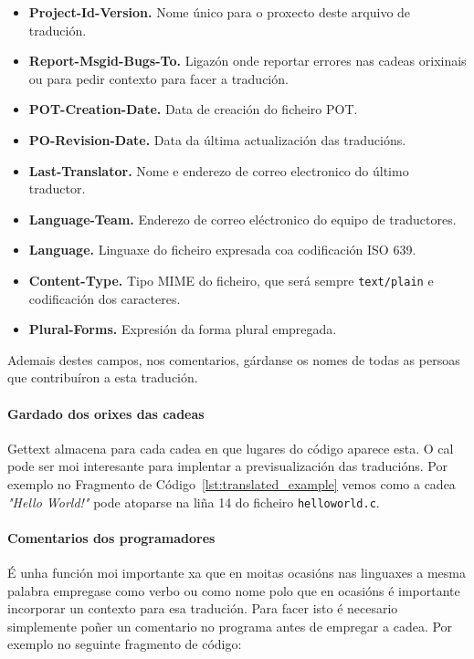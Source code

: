 \begin{itemize}
    \item \textbf{Project-Id-Version.} Nome único para o proxecto deste arquivo de tradución.
    \item \textbf{Report-Msgid-Bugs-To.} Ligazón onde reportar errores nas cadeas orixinais ou para pedir contexto para facer a tradución.
    \item \textbf{POT-Creation-Date.} Data de creación do ficheiro POT.
    \item \textbf{PO-Revision-Date.} Data da última actualización das traducións.
    \item \textbf{Last-Translator.} Nome e enderezo de correo electronico do último traductor.
    \item \textbf{Language-Team.} Enderezo de correo eléctronico do equipo de traductores.
    \item \textbf{Language.} Linguaxe do ficheiro expresada coa codificación ISO 639.
    \item \textbf{Content-Type.} Tipo MIME do ficheiro, que será sempre \lstinline{text/plain} e codificación dos caracteres.
    \item \textbf{Plural-Forms.} Expresión da forma plural empregada.
\end{itemize}

Ademais destes campos, nos comentarios, gárdanse os nomes de todas as persoas que contribuíron a esta tradución.

\paragraph{Gardado dos orixes das cadeas}
Gettext almacena para cada cadea en que lugares do código aparece esta. O cal pode ser moi interesante para implentar a previsualización das traducións. Por exemplo no Fragmento de Código~\ref{lst:translated_example} vemos como a cadea \emph{"Hello World!"} pode atoparse na liña 14 do ficheiro \lstinline{helloworld.c}.

\paragraph{Comentarios dos programadores}
É unha función moi importante xa que en moitas ocasións nas linguaxes a mesma palabra empregase como verbo ou como nome polo que en ocasións é importante incorporar un contexto para esa tradución. Para facer isto é necesario simplemente poñer un comentario no programa antes de empregar a cadea. Por exemplo no seguinte fragmento de código:

